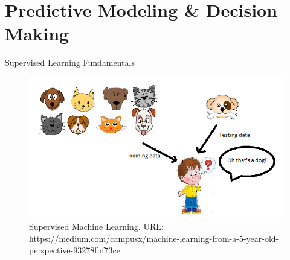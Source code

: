 \section{Predictive Modeling \& Decision Making}
\frame{\sectionpage}



\begin{frame}{Supervised Learning Fundamentals}
    \begin{figure}
        \includegraphics[scale=0.4]{img/supervised_learning_example.png}
        \caption{Supervised Machine Learning. URL: https://medium.com/campusx/machine-learning-from-a-5-year-old-perspective-93278fbf73ce}
    \end{figure}
\end{frame}

